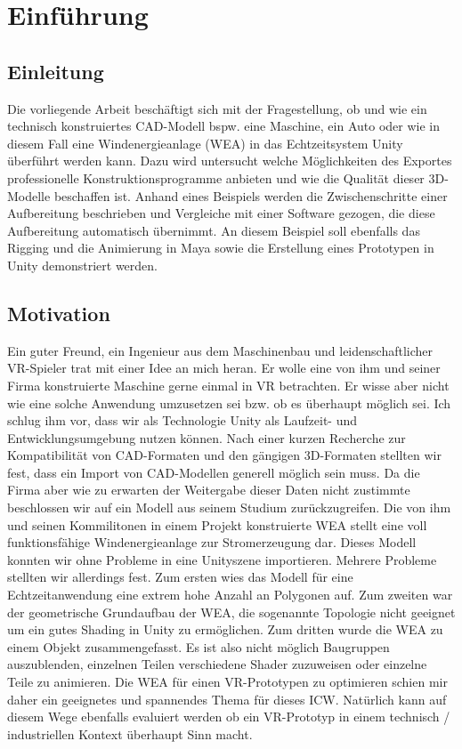 \chapter{Einführung}
\section{Einleitung}

Die vorliegende Arbeit beschäftigt sich mit der Fragestellung, ob und wie ein technisch konstruiertes CAD-Modell bspw. eine Maschine, ein Auto oder wie in diesem Fall eine Windenergieanlage (WEA) in das Echtzeitsystem Unity überführt werden kann. Dazu wird untersucht welche Möglichkeiten des Exportes professionelle Konstruktionsprogramme anbieten und wie die Qualität dieser 3D-Modelle beschaffen ist. Anhand eines Beispiels werden die Zwischenschritte einer Aufbereitung beschrieben und Vergleiche mit einer Software gezogen, die diese Aufbereitung automatisch übernimmt. An diesem Beispiel soll ebenfalls das Rigging und die Animierung in Maya sowie die Erstellung eines Prototypen in Unity demonstriert werden. 

\newpage
\section{Motivation}

Ein guter Freund, ein Ingenieur aus dem Maschinenbau und leidenschaftlicher VR-Spieler trat mit einer Idee an mich heran. Er wolle eine von ihm und seiner Firma konstruierte Maschine gerne einmal in VR betrachten. Er wisse aber nicht wie eine solche Anwendung umzusetzen sei bzw. ob es überhaupt möglich sei. Ich schlug ihm vor, dass wir als Technologie Unity als Laufzeit- und Entwicklungsumgebung nutzen können. Nach einer kurzen Recherche  zur Kompatibilität von CAD-Formaten und den gängigen 3D-Formaten stellten wir fest, dass ein Import von CAD-Modellen generell möglich sein muss. Da die Firma aber wie zu erwarten der Weitergabe dieser Daten nicht zustimmte beschlossen wir auf ein Modell aus seinem Studium zurückzugreifen. Die von ihm und seinen Kommilitonen in einem Projekt konstruierte WEA stellt eine voll funktionsfähige Windenergieanlage zur Stromerzeugung dar. Dieses Modell konnten wir ohne Probleme in eine Unityszene importieren. Mehrere Probleme stellten wir allerdings fest. Zum ersten wies das Modell für eine Echtzeitanwendung eine extrem hohe  Anzahl an Polygonen auf. Zum zweiten war der geometrische Grundaufbau der WEA, die sogenannte Topologie nicht geeignet um ein gutes Shading in Unity zu ermöglichen. Zum dritten wurde die WEA zu einem Objekt zusammengefasst. Es ist also nicht möglich Baugruppen auszublenden, einzelnen Teilen verschiedene Shader zuzuweisen oder einzelne Teile zu animieren. Die WEA für einen VR-Prototypen zu optimieren schien mir daher ein geeignetes und spannendes Thema für dieses ICW. Natürlich kann auf diesem Wege ebenfalls evaluiert werden ob ein VR-Prototyp in einem technisch / industriellen Kontext überhaupt Sinn macht.  

